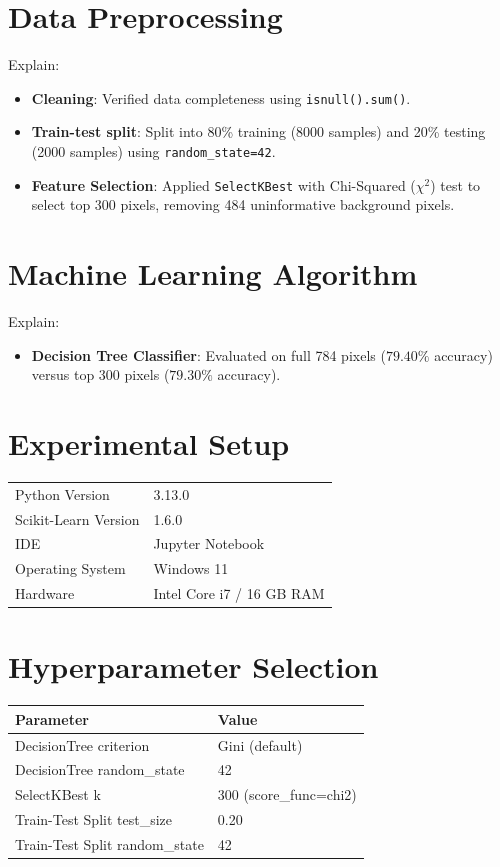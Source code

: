 \documentclass[12pt,a4paper]{article}
\begin{document}
\section{Data Preprocessing}

Explain:
\begin{itemize}
\item \textbf{Cleaning}: Verified data completeness using \texttt{isnull().sum()}.
\item \textbf{Train-test split}: Split into 80\% training (8000 samples) and 20\% testing (2000 samples) using \texttt{random\_state=42}.
\item \textbf{Feature Selection}: Applied \texttt{SelectKBest} with Chi-Squared ($\chi^2$) test to select top 300 pixels, removing 484 uninformative background pixels.
\end{itemize}

\section{Machine Learning Algorithm}

Explain:
\begin{itemize}
\item \textbf{Decision Tree Classifier}: Evaluated on full 784 pixels ($79.40\%$ accuracy) versus top 300 pixels ($79.30\%$ accuracy).
\end{itemize}

\section{Experimental Setup}

\begin{tabular}{ll}
\toprule
Python Version & 3.13.0 \\
Scikit-Learn Version & 1.6.0 \\
IDE & Jupyter Notebook \\
Operating System & Windows 11 \\
Hardware & Intel Core i7 / 16 GB RAM \\
\bottomrule
\end{tabular}

\section{Hyperparameter Selection}

\begin{tabular}{ll}
\toprule
Parameter & Value\\
\midrule
DecisionTree criterion & Gini (default) \\
DecisionTree random\_state & 42 \\
SelectKBest k & 300 (score\_func=chi2) \\
Train-Test Split test\_size & 0.20 \\
Train-Test Split random\_state & 42 \\
\bottomrule
\end{tabular}
\end{document}
